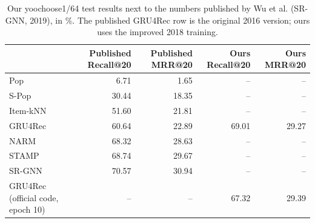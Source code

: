 \begin{table}[H]
\centering\small
\caption{Our yoochoose1/64 test results next to the numbers published by Wu et al. (SR-GNN, 2019), in \%. The published GRU4Rec row is the original 2016 version; ours uses the improved 2018 training.}
\label{tab:repro}
\begin{tabular}{lrrrr}
\toprule
 & Published Recall@20 & Published MRR@20 & Ours Recall@20 & Ours MRR@20 \\
\midrule
Pop & 6.71 & 1.65 & -- & -- \\
S-Pop & 30.44 & 18.35 & -- & -- \\
Item-kNN & 51.60 & 21.81 & -- & -- \\
GRU4Rec & 60.64 & 22.89 & 69.01 & 29.27 \\
NARM & 68.32 & 28.63 & -- & -- \\
STAMP & 68.74 & 29.67 & -- & -- \\
SR-GNN & 70.57 & 30.94 & -- & -- \\
GRU4Rec (official code, epoch 10) & -- & -- & 67.32 & 29.39 \\
\bottomrule
\end{tabular}
\end{table}
